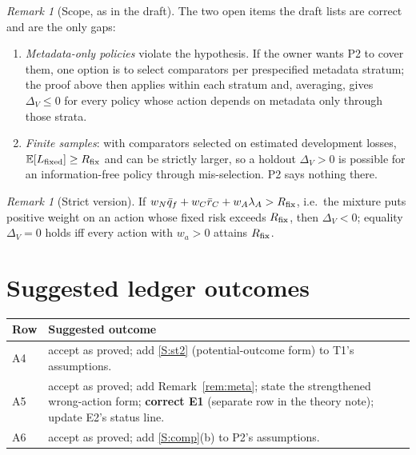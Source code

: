 \documentclass[11pt,a4paper]{article}
\theoremstyle{definition}
\theoremstyle{remark}
\newtheorem{remark}[theorem]{Remark}
\newcommand{\E}{\mathbb{E}}
\newcommand{\lA}{\lambda_A}
\begin{document}
\begin{remark}[Scope, as in the draft]
The two open items the draft lists are correct and are the only gaps:
\begin{enumerate}[nosep]
\item \emph{Metadata-only policies} violate the hypothesis. If the owner wants P2 to cover
them, one option is to select comparators per prespecified metadata stratum; the proof
above then applies within each stratum and, averaging, gives $\Delta_V\le0$ for every
policy whose action depends on metadata only through those strata.
\item \emph{Finite samples}: with comparators selected on estimated development losses,
$\E[L_{\rm fixed}]\ge R_{\rm fix}$ and can be strictly larger, so a holdout
$\Delta_V>0$ is possible for an information-free policy through mis-selection. P2 says
nothing there.
\end{enumerate}
\end{remark}

\begin{remark}[Strict version]
If $w_N\bar q_f+w_C\bar r_C+w_A\lA>R_{\rm fix}$, i.e.\ the mixture puts positive weight on
an action whose fixed risk exceeds $R_{\rm fix}$, then $\Delta_V<0$; equality
$\Delta_V=0$ holds iff every action with $w_a>0$ attains $R_{\rm fix}$.
\end{remark}

\section{Suggested ledger outcomes}
\begin{center}
\begin{tabular}{@{}p{}p{}@{}}
\toprule
Row & Suggested outcome\\
\midrule
A4 & accept as proved; add \ref{S:st2} (potential-outcome form) to T1's assumptions.\\
A5 & accept as proved; add Remark~\ref{rem:meta}; state the strengthened wrong-action form;
\textbf{correct E1} (separate row in the theory note); update E2's status line.\\
A6 & accept as proved; add \ref{S:comp}(b) to P2's assumptions.\\
\bottomrule
\end{tabular}
\end{center}
\end{document}
